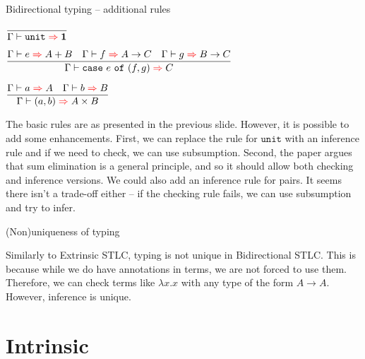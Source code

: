 \documentclass{beamer}
\newcommand{\Fun}[2]{#1 \to #2}
\newcommand{\Prod}[2]{#1 \times #2}
\newcommand{\Sum}[2]{#1 + #2}
\newcommand{\Unit}{\textbf{1}}
\newcommand{\fun}[2]{\lambda #1. #2}
\newcommand{\pair}[2]{(#1, #2)}
\newcommand{\case}[3]{\texttt{case}\ #1\ \texttt{of}\ (#2, #3)}
\newcommand{\unit}{\texttt{unit}}
\newcommand{\rulename}[1]{\textsc{\footnotesize{#1}}}
\newcommand{\infrule}[3][]{\displaystyle \frac{#2}{#3} \rulename{#1}}
\begin{document}
\begin{frame}{Bidirectional typing -- additional rules}

\begin{center}
  $\infrule{}{\infer{\unit}{\Unit}}$

  \vspace{1em}

  $\infrule{\infer{e}{\Sum{A}{B}} \quad \infer{f}{\Fun{A}{C}} \quad \infer{g}{\Fun{B}{C}}}{\infer{\case{e}{f}{g}}{C}}$

  \vspace{1em}

  $\infrule{\infer{a}{A} \quad \infer{b}{B}}{\infer{\pair{a}{b}}{\Prod{A}{B}}}$
\end{center}

\vspace{1em}

The basic rules are as presented in the previous slide. However, it is possible to add some enhancements. First, we can replace the rule for $\unit$ with an inference rule and if we need to check, we can use subsumption. Second, the paper argues that sum elimination is a general principle, and so it should allow both checking and inference versions. We could also add an inference rule for pairs. It seems there isn't a trade-off either -- if the checking rule fails, we can use subsumption and try to infer.

\end{frame}

\begin{frame}{(Non)uniqueness of typing}

Similarly to Extrinsic STLC, typing is not unique in Bidirectional STLC. This is because while we do have annotations in terms, we are not forced to use them. Therefore, we can check terms like $\fun{x}{x}$ with any type of the form $\Fun{A}{A}$. However, inference is unique.

\end{frame}

\section{Intrinsic}

\newcommand{\ifun}[3]{\lambda #1 : #2. #3}
\newcommand{\iinl}[2]{\texttt{inl}_{#1}\ #2}
\newcommand{\iinr}[2]{\texttt{inr}_{#1}\ #2}
\newcommand{\iexfalso}[2]{\texttt{exfalso}_{#1}\ #2}

\newcommand{\termdiff}[1]{\mathcolor{red}{#1}}
\end{document}
